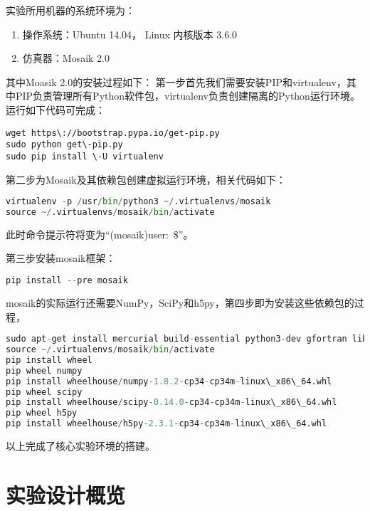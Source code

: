 实验所用机器的系统环境为：
\begin{enumerate}
\item 操作系统：Ubuntu 14.04， Linux 内核版本 3.6.0
\item 仿真器：Mosaik 2.0
\end{enumerate}

其中Moasik 2.0的安装过程如下：
第一步首先我们需要安装PIP和virtualenv，其中PIP负责管理所有Python软件包，virtualenv负责创建隔离的Python运行环境。运行如下代码可完成：


\begin{lstlisting}[language={Tex}]
wget https\://bootstrap.pypa.io/get-pip.py
sudo python get\-pip.py
sudo pip install \-U virtualenv

\end{lstlisting}

第二步为Mosaik及其依赖包创建虚拟运行环境，相关代码如下：

\begin{lstlisting}[language={Python}]
virtualenv -p /usr/bin/python3 ~/.virtualenvs/mosaik
source ~/.virtualenvs/mosaik/bin/activate

\end{lstlisting}

此时命令提示符将变为“(mosaik)user\@kubuntu:~\$”。

第三步安装mosaik框架：

\begin{lstlisting}[language={Python}]
pip install --pre mosaik

\end{lstlisting}

mosaik的实际运行还需要NumPy，SciPy和h5py，第四步即为安装这些依赖包的过程，

\begin{lstlisting}[language={Python}]
sudo apt-get install mercurial build-essential python3-dev gfortran libatlas-dev libatlas-base-dev libhdf5-dev
source ~/.virtualenvs/mosaik/bin/activate
pip install wheel
pip wheel numpy
pip install wheelhouse/numpy-1.8.2-cp34-cp34m-linux\_x86\_64.whl
pip wheel scipy
pip install wheelhouse/scipy-0.14.0-cp34-cp34m-linux\_x86\_64.whl
pip wheel h5py
pip install wheelhouse/h5py-2.3.1-cp34-cp34m-linux\_x86\_64.whl

\end{lstlisting}

以上完成了核心实验环境的搭建。

\section{实验设计概览}

